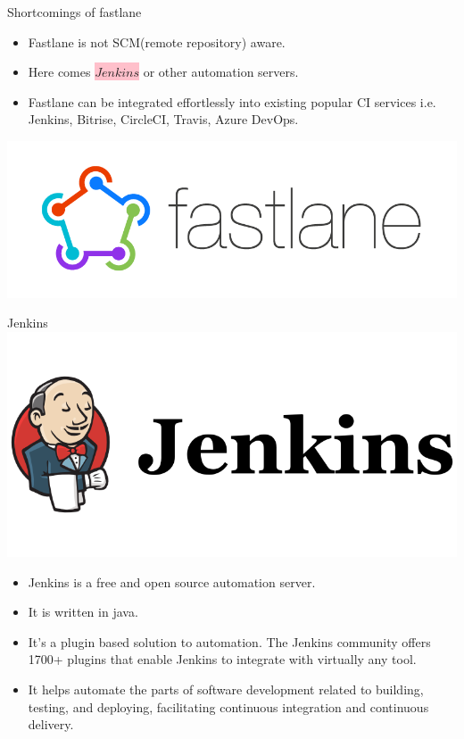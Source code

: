 \documentclass{beamer}
\begin{document}
\begin{frame}{Shortcomings of fastlane}
    \begin{itemize}
        \item Fastlane is not SCM(remote repository) aware.
        \item Here comes \colorbox{pink}{$Jenkins$} or other automation servers.
        \item Fastlane can be integrated effortlessly into existing popular CI services i.e. Jenkins, Bitrise, CircleCI, Travis, Azure DevOps.
    \end{itemize}
    \includegraphics[scale=0.25]{fastlane.png}\centering
\end{frame}


\begin{frame}{Jenkins}
    \includegraphics[scale = 0.21]{jenkins.png}\centering
    \begin{itemize}
        \item Jenkins is a free and open source automation server.
        \item It is written in java.
        \item It's a plugin based solution to automation. The Jenkins community offers 1700+ plugins that enable Jenkins to integrate with virtually any tool.
        \item It helps automate the parts of software development related to building, testing, and deploying, facilitating continuous integration and continuous delivery.
    \end{itemize}
\end{frame}
\end{document}
